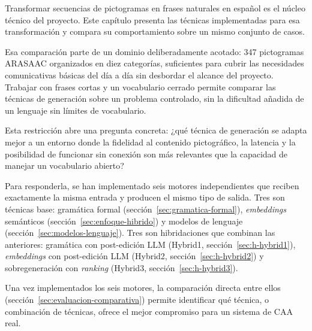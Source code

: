 Transformar secuencias de pictogramas en frases naturales en español es el núcleo técnico del proyecto. Este capítulo presenta las técnicas implementadas para esa transformación y compara su comportamiento sobre un mismo conjunto de casos.

Esa comparación parte de un dominio deliberadamente acotado: 347 pictogramas ARASAAC organizados en diez categorías, suficientes para cubrir las necesidades comunicativas básicas del día a día sin desbordar el alcance del proyecto. Trabajar con frases cortas y un vocabulario cerrado permite comparar las técnicas de generación sobre un problema controlado, sin la dificultad añadida de un lenguaje sin límites de vocabulario.

Esta restricción abre una pregunta concreta: ¿qué técnica de generación se adapta mejor a un entorno donde la fidelidad al contenido pictográfico, la latencia y la posibilidad de funcionar sin conexión son más relevantes que la capacidad de manejar un vocabulario abierto?

Para responderla, se han implementado seis motores independientes que reciben exactamente la misma entrada y producen el mismo tipo de salida. Tres son técnicas base: gramática formal (sección~\ref{sec:gramatica-formal}), \textit{embeddings} semánticos (sección~\ref{sec:enfoque-hibrido}) y modelos de lenguaje (sección~\ref{sec:modelos-lenguaje}). Tres son hibridaciones que combinan las anteriores: gramática con post-edición LLM (Hybrid1, sección~\ref{sec:h-hybrid1}), \textit{embeddings} con post-edición LLM (Hybrid2, sección~\ref{sec:h-hybrid2}) y sobregeneración con \textit{ranking} (Hybrid3, sección~\ref{sec:h-hybrid3}).

Una vez implementados los seis motores, la comparación directa entre ellos (sección~\ref{sec:evaluacion-comparativa}) permite identificar qué técnica, o combinación de técnicas, ofrece el mejor compromiso para un sistema de CAA real.


